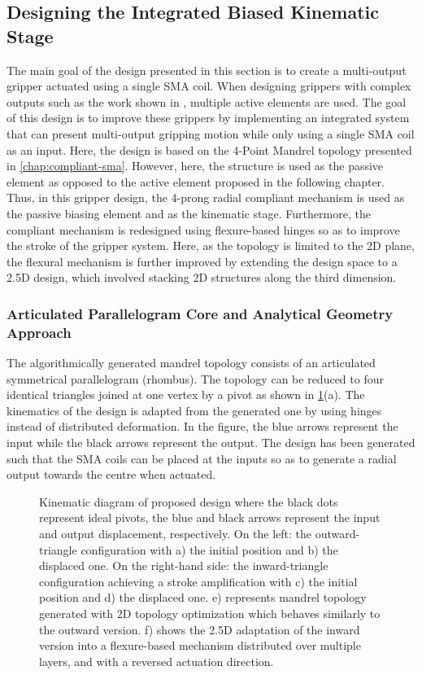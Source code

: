 \subsection{Designing the Integrated Biased Kinematic Stage}
The main goal of the design presented in this section is to create a multi-output gripper actuated using a single SMA coil. When designing grippers with complex outputs such as the work shown in \todocite, multiple active elements are used. The goal of this design is to improve these grippers by implementing an integrated system that can present multi-output gripping motion while only using a single SMA coil as an input. Here, the design is based on the 4-Point Mandrel topology presented in \cref{chap:compliant-sma}. However, here, the structure is used as the passive element as opposed to the active element proposed in the following chapter. Thus, in this gripper design, the 4-prong radial compliant mechanism is used as the passive biasing element and as the kinematic stage. Furthermore, the compliant mechanism is redesigned using flexure-based hinges so as to improve the stroke of the gripper system. Here, as the topology is limited to the 2D plane, the flexural mechanism is further improved by extending the design space to a 2.5D design, which involved stacking 2D structures along the third dimension.
\subsubsection{Articulated Parallelogram Core and Analytical Geometry Approach}
The algorithmically generated mandrel topology consists of an articulated symmetrical parallelogram (rhombus). The topology can be reduced to four identical triangles joined at one vertex by a pivot as shown in \cref{fig:mandrel-kinematic}(a). The kinematics of the design is adapted from the generated one by using hinges instead of distributed deformation. In the figure, the blue arrows represent the input while the black arrows represent the output. The design has been generated such that the SMA coils can be placed at the inputs so as to generate a radial output towards the centre when actuated.

\begin{figure}[t] %
  \centering
  \resizebox{\textwidth}{!}{}
  \caption{Kinematic diagram of proposed design where the black dots represent ideal pivots, the blue and black arrows represent the input and output displacement, respectively. On the left: the outward-triangle configuration with a) the initial position and b) the displaced one. On the right-hand side: the inward-triangle configuration achieving a stroke amplification with c) the initial position and d) the displaced one. e) represents mandrel topology generated with 2D topology optimization which behaves similarly to the outward version. f) shows the 2.5D adaptation of the inward version into a flexure-based mechanism distributed over multiple layers, and with a reversed actuation direction.}
  \label{fig:mandrel-kinematic}
\end{figure}

